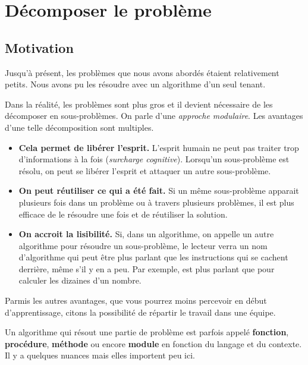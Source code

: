 \chapter{Décomposer le problème}

\section{Motivation}

	Jusqu’à présent, 
	les problèmes que nous avons abordés étaient relativement petits.
	Nous avons pu les résoudre avec un algorithme d’un seul tenant.
	
	Dans la réalité,
	les problèmes sont plus gros 
	et il devient nécessaire de les décomposer en sous-problèmes.
	On parle d’une \emph{approche modulaire}.
	Les avantages d’une telle décomposition sont multiples.
	\begin{itemize}
	\item
		\textbf{Cela permet de libérer l’esprit.}
		L’esprit humain ne peut pas traiter trop d’informations à la fois
		(\emph{surcharge cognitive}).
		Lorsqu’un sous-problème est résolu,
		on peut se libérer l’esprit et attaquer un autre sous-problème.
	\item
		\textbf{On peut réutiliser ce qui a été fait.}
		Si un même sous-problème apparait plusieurs fois
		dans un problème ou à travers plusieurs problèmes,
		il est plus efficace de le résoudre une fois et
		de réutiliser la solution.
	\item
		\textbf{On accroit la lisibilité.}
		Si, dans un algorithme, 
		on appelle un autre algorithme pour résoudre un sous-problème,
		le lecteur verra un nom d’algorithme qui peut être plus parlant
		que les instructions qui se cachent derrière, même s’il y en a peu.
		Par exemple,  est plus parlant que
		 pour calculer les dizaines d’un nombre.
	\end{itemize}

	Parmis les autres avantages, 
	que vous pourrez moins percevoir en début d’apprentissage,
	citons la possibilité de répartir le travail dans une équipe.
	
	Un algorithme qui résout une partie de problème
	est parfois appelé \textbf{fonction}, 
	\textbf{procédure}, 
	\textbf{méthode} ou encore
	\textbf{module}
	en fonction du langage et du contexte.
	Il y a quelques nuances mais elles importent peu ici.
	
